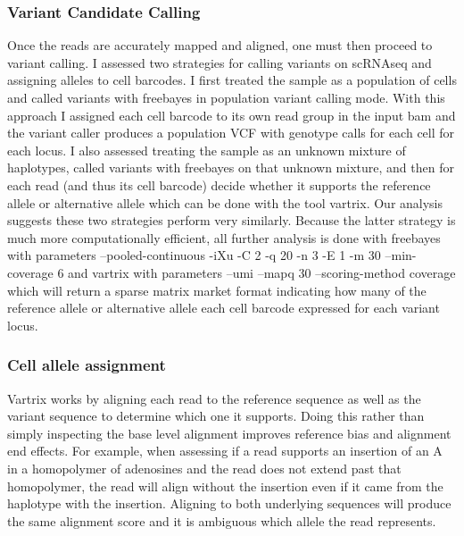 \subsubsection{Variant Candidate Calling}
\par{
Once the reads are accurately mapped and aligned, one must then proceed to variant calling. I assessed two strategies for calling variants on scRNAseq and assigning alleles to cell barcodes. I first treated 
the sample as a population of cells and called variants with freebayes in population variant calling mode\cite{freebayes}\cite{gatk}\cite{samtools}. With this approach I assigned each cell barcode to its own read group in the input bam and the variant caller produces a population VCF with genotype calls for each cell for each locus.
I also assessed treating the sample as an unknown mixture of haplotypes, called variants with freebayes on that unknown mixture, and then for each read (and thus its cell barcode) decide whether it supports the reference allele or alternative allele which can be done with the tool vartrix\cite{vartrix}. Our analysis suggests these two strategies perform very similarly. Because the latter strategy is much more computationally efficient, all further analysis is done with freebayes with parameters --pooled-continuous -iXu -C 2 -q 20 -n 3 -E 1 -m 30 --min-coverage 6 and vartrix with parameters  --umi --mapq 30 --scoring-method coverage which will return a sparse matrix market format indicating how many of the reference allele or alternative allele each cell barcode expressed for each variant locus.
}
\subsubsection{Cell allele assignment}
\par{
 Vartrix works by aligning each read to the reference sequence as well as the variant sequence to determine which one it supports. Doing this rather than simply inspecting the base level alignment improves reference bias and alignment end effects. For example, when assessing if a read supports an insertion of an A in a homopolymer of adenosines and the read does not extend past that homopolymer, the read will align without the insertion even if it came from the haplotype with the insertion. Aligning to both underlying sequences will produce the same alignment score and it is ambiguous which allele the read represents.
}
